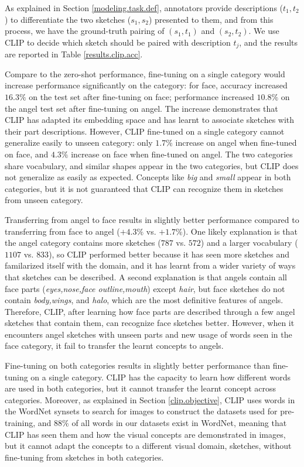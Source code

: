 As explained in Section \ref{modeling.task.def}, annotators provide descriptions ($t_1,t_2$) to differentiate the two sketches ($s_1,s_2$) presented to them, and from this process, we have the ground-truth pairing of $(s_1,t_1)$ and $(s_2,t_2)$. We use CLIP to decide which sketch should be paired with description $t_j$, and the results are reported in Table \ref{results.clip.acc}. 

Compare to the zero-shot performance, fine-tuning on a single category would increase performance significantly on the category: for face, accuracy increased $16.3\%$ on the test set after fine-tuning on face; performance increased $10.8\%$ on the angel test set after fine-tuning on angel. The increase demonstrates that CLIP has adapted its embedding space and has learnt to associate sketches with their part descriptions. 
However, CLIP fine-tuned on a single category cannot generalize easily to unseen category: only $1.7\%$ increase on angel when fine-tuned on face, and $4.3\%$ increase on face when fine-tuned on angel.   
The two categories share vocabulary, and similar shapes appear in the two categories, but CLIP does not generalize as easily as expected. Concepts like \textit{big} and \textit{small} appear in both categories, but it is not guaranteed that CLIP can recognize them in sketches from unseen category.  

Transferring from angel to face results in slightly better performance compared to transferring from face to angel ($+4.3\%$ vs. $+1.7\%$). One likely explanation is that the angel category contains more sketches ($787$ vs. $572$) and a larger vocabulary ($1107$ vs. $833$), so CLIP performed better because it has seen more sketches and familarized itself with the domain, and it has learnt from a wider variety of ways that sketches can be described. A second explanation is that angels contain all face parts (\textit{eyes,nose,face outline,mouth}) except \textit{hair}, but face sketches do not contain \textit{body,wings}, and \textit{halo}, which are the most definitive features of angels. Therefore, CLIP, after learning how face parts are described through a few angel sketches that contain them, can recognize face sketches better. However, when it encounters angel sketches with unseen parts and new usage of words seen in the face category, it fail to transfer the learnt concepts to angels.         

Fine-tuning on both categories results in slightly better performance than fine-tuning on a single category. CLIP has the capacity to learn how different words are used in both categories, but it cannot transfer the learnt concept across categories. Moreover, as explained in Section \ref{clip.objective}, CLIP uses words in the WordNet synsets to search for images to construct the datasets used for pre-training, and $88\%$ of all words in our datasets exist in WordNet, meaning that CLIP has seen them and how the visual concepts are demonstrated in images, but it cannot adapt the concepts to a different visual domain, sketches, without fine-tuning from sketches in both categories.        


